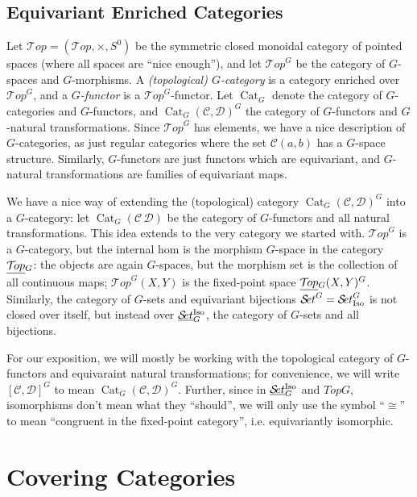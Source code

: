 \documentclass{report}
\newcommand{\Top}{\text{$\mathcal{T}\!op$}}
\newcommand{\Set}{\text{$\mathcal{S}\!et$}}
\DeclareMathOperator{\Cat}{Cat}
\newcommand{\TopG}{\text{\underline{$\Top$}$_G$}}
\newcommand{\SetG}{\text{\underline{$\Set$}$_G^{\mbox{\scriptsize Iso}}$}}
\renewcommand{\C}{\text{$\mathcal{C}$}}
\newcommand{\D}{\text{$\mathcal{D}$}}
\begin{document}
\begin{appendices}
  \section{Equivariant Enriched Categories}
  \label{equiv_enriched}
  Let $\Top = (\Top, \times, S^0)$ be the symmetric closed monoidal category of pointed spaces (where all spaces are ``nice enough''), and let $\Top^G$ be the category of $G$-spaces and $G$-morphisms. A {\em (topological) $G$-category} is a category enriched over $\Top^G$, and a {\em $G$-functor} is a $\Top^G$-functor. Let $\Cat_G$ denote the category of $G$-categories and $G$-functors, and $\Cat_G(\C,\D)^G$ the category of $G$-functors and $G$-natural transformations. Since $\Top^G$ has elements, we have a nice description of $G$-categories, as just regular categories where the set $\C(a,b)$ has a $G$-space structure. Similarly, $G$-functors are just functors which are equivariant, and $G$-natural transformations are families of equivariant maps.

  We have a nice way of extending the (topological) category $\Cat_G(\C,\D)^G$ into a $G$-category: let $\Cat_G(\C\,\D)$ be the category of $G$-functors and all natural transformations. This idea extends to the very category we started with. $\Top^G$ is a $G$-category, but the internal hom is the morphism $G$-space in the category $\TopG$: the objects are again $G$-spaces, but the morphism set is the collection of all continuous maps; $\Top^G(X,Y)$ is the fixed-point space $\TopG(X,Y)^G$. Similarly, the category of $G$-sets and equivariant bijections $\Set^G=\Set^G_{\mbox{\scriptsize Iso}}$ is not closed over itself, but instead over $\SetG$, the category of $G$-sets and all bijections.

  For our exposition, we will mostly be working with the topological category of $G$-functors and equivaraint natural transformations; for convenience, we will write $[\C,\D]^G$ to mean $\Cat_G(\C,\D)^G$. Further, since in $\SetG$ and $TopG$, isomorphisms don't mean what they ``should'', we will only use the symbol ``$\cong$'' to mean ``congruent in the fixed-point category'', i.e. equivariantly isomorphic.



\chapter{Covering Categories}
\label{covering_cats}



\end{appendices}
\end{document}
